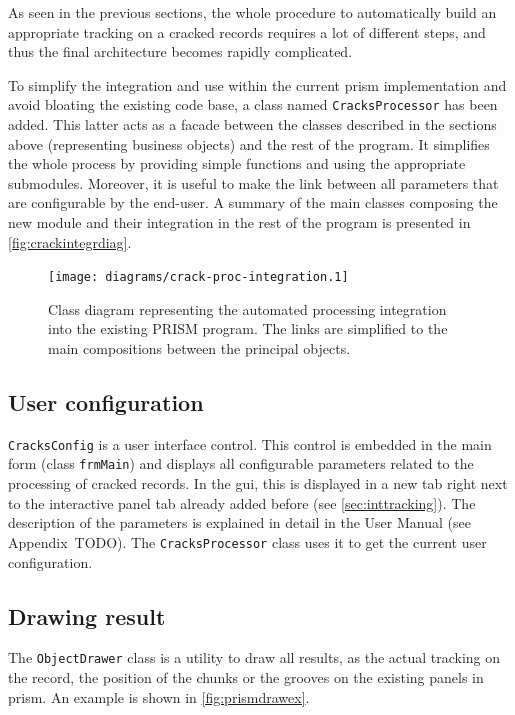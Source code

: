 As seen in the previous sections, the whole procedure to automatically build an appropriate tracking on a cracked records requires a lot of different steps, and thus the final architecture becomes rapidly complicated.

To simplify the integration and use within the current \gls{prism} implementation and avoid bloating the existing code base, a class named \texttt{CracksProcessor} has been added. This latter acts as a facade between the classes described in the sections above (representing business objects) and the rest of the program. It simplifies the whole process by providing simple functions and using the appropriate submodules. Moreover, it is useful to make the link between all parameters that are configurable by the end-user. A summary of the main classes composing the new module and their integration in the rest of the program is presented in \autoref{fig:crackintegrdiag}.

\begin{figure}[!ht]
\centering
\texttt{[image: diagrams/crack-proc-integration.1]}
\caption[Class diagram representing the automated processing integration.]
{Class diagram representing the automated processing integration into the existing PRISM program. The links are simplified to the main compositions between the principal objects.}
\label{fig:crackintegrdiag}
\end{figure}

\subsection{User configuration}

\texttt{CracksConfig} is a user interface control. This control is embedded in the main form (class \texttt{frmMain}) and displays all configurable parameters related to the processing of cracked records. In the \gls{gui}, this is displayed in a new tab right next to the interactive panel tab already added before (see \autoref{sec:inttracking}). The description of the parameters is explained in detail in the User Manual (see Appendix~TODO). The \texttt{CracksProcessor} class uses it to get the current user configuration.

\subsection{Drawing result}

The \texttt{ObjectDrawer} class is a utility to draw all results, as the actual tracking on the record, the position of the chunks or the grooves on the existing panels in \gls{prism}. An example is shown in \autoref{fig:prismdrawex}.

